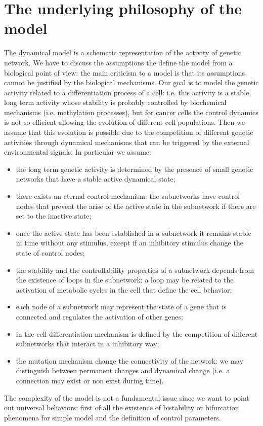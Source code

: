 \section{The underlying philosophy of the model}
The dynamical model is a schematic representation of the activity of genetic network. We have to discuss the assumptions the define the model from a biological 
point of view: the main criticism to a model is that its assumptions cannot be justified by the biological mechanisms. 
Our goal is to model the genetic activity related to a differentiation process of a cell: i.e. this activity is a stable long term activity whose stability
is probably controlled by biochemical mechanisms (i.e. methylation processes), but for cancer cells the control dynamics is not so efficient allowing
the evolution of different cell populations. Then we assume that this evolution is possible due to the competition of different genetic activities through
dynamical mechanisms that can be triggered by the external environmental signals.
In particular we assume:
\begin{itemize}
\item the long term genetic activity is determined by the presence of small genetic networks that have a stable active dynamical state;
\item there exists an eternal control mechanism: the subnetworks have control nodes that prevent the arise of the active state in the subnetwork if there
are set to the inactive state;
\item once the active state has been established in a subnetwork it remains stable in time without any stimulus, except if an inhibitory stimulus 
change the state of control nodes;
\item the stability and the controllability properties of a subnetwork depends from the existence of loops in the subnetwork: a loop may be related to the activation
of metabolic cycles in the cell that define the cell behavior;
\item each node of a subnetwork may represent the state of a gene that is connected and regulates the activation of other genes;
\item in the cell differentiation mechanism is defined by the competition of different subnetworks that interact in a inhibitory way;
\item the mutation mechanism change the connectivity of the network: we may distinguish between permanent changes and dynamical change (i.e. a connection
may exist or non exist during time).
\end{itemize}
The complexity of the model is not a fundamental issue since we want to point out universal behaviors:  first of all the existence of bistability or bifurcation 
phenomena for simple model and the definition of control parameters.
%
